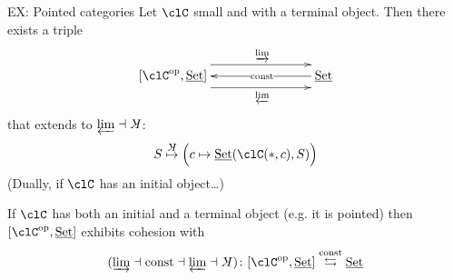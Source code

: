 \documentclass[presentation,handout]{beamer}
\begin{document}
%
%
%
%
%
%
%
\begin{frame}{EX: Pointed categories}
  \def\coconst{\rotatebox[origin=c]{180}{$K$}}
  Let $\clC$ small and with a terminal object. Then there exists a triple
  \[
  \xymatrix@C=2cm{
  **[l] [\clC^\text{op},\Set] \ar@<9pt>[r]^\varinjlim \ar@<-9pt>[r]_\varprojlim & \ar[l]|{\text{const}} \Set
  }
  \]
  that extends to $\varprojlim\dashv \coconst$:
  \[
  S\overset{{\footnotesize\coconst}}\mapsto \Big( c\mapsto \Set(\clC(*,c),S) \Big)
  \]
  \onslide<+->
  (Dually, if $\clC$ has an initial object\dots)
  \onslide<+->
  \begin{prop}
    If $\clC$ has both an initial and a terminal object (e.g. it is pointed) then $[\clC^\text{op},\Set]$ exhibits cohesion with
    \[
    (\varinjlim \dashv \text{const} \dashv \varprojlim \dashv \coconst) \colon [\clC^\text{op},\Set] \overset{\text{const}}\leftrightarrows \Set
    \]
  \end{prop}
\end{frame}
%
%
%
%
%
%
%
  
  
  
\end{document}
